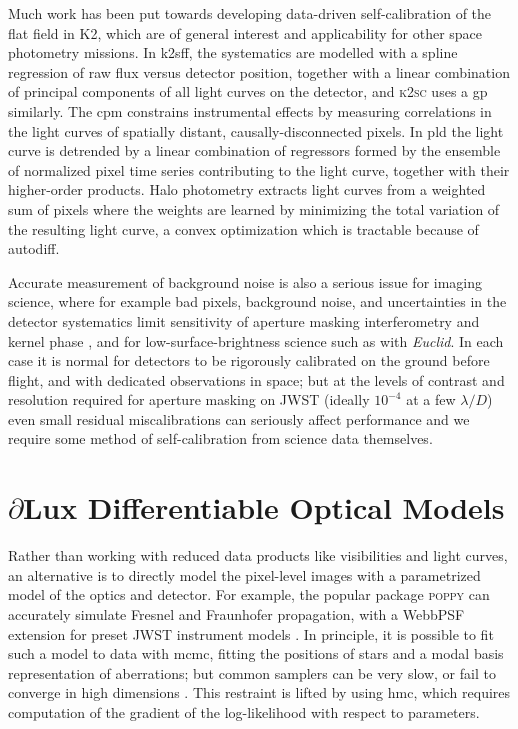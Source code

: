 \documentclass[twocolumn]{spie}
\newcommand\dlux{$\partial$Lux\xspace}
\begin{document}
Much work has been put towards developing data-driven self-calibration of the flat field in K2, which are of general interest and applicability for other space photometry missions. 
In \ac{k2sff}, the systematics are modelled with a spline regression of raw flux versus detector position, together with a linear combination of principal components of all light curves on the detector, and \textsc{k2sc} \cite{Aigrain2016} uses a \ac{gp} similarly. 
The \ac{cpm} constrains instrumental effects by measuring correlations in the light curves of spatially distant, causally-disconnected pixels.
In \ac{pld} the light curve is detrended by a linear combination of regressors formed by the ensemble of normalized pixel time series contributing to the light curve, together with their higher-order products.
Halo photometry \cite{halo, halo2} extracts light curves from a weighted sum of pixels where the weights are learned by minimizing the total variation of the resulting light curve, a convex optimization which is tractable because of autodiff.

Accurate measurement of background noise is also a serious issue for imaging science, where for example bad pixels, background noise, and uncertainties in the detector systematics limit sensitivity of aperture masking interferometry and kernel phase \cite{Kammerer2019}, and for low-surface-brightness science such as with \textit{Euclid}\cite{EuclidCollaboration2022}. In each case it is normal for detectors to be rigorously calibrated on the ground before flight, and with dedicated observations in space; but at the levels of contrast and resolution required for aperture masking on JWST (ideally $10^{-4}$ at a few $\lambda/D$) even small residual miscalibrations can seriously affect performance \cite{Sivaramakrishnan2022} and we require some method of self-calibration from science data themselves.

\section{\dlux Differentiable Optical Models}
\label{sec:dlux}

Rather than working with reduced data products like visibilities and light curves, an alternative is to directly model the pixel-level images with a parametrized model of the optics and detector. 
For example, the popular package \textsc{poppy} \cite{poppy} can accurately simulate Fresnel and Fraunhofer propagation, with a WebbPSF extension for preset JWST instrument models \cite{Perrin2014}. 
In principle, it is possible to fit such a model to data with \ac{mcmc}, fitting the positions of stars and a modal basis representation of aberrations; but common samplers can be very slow, or fail to converge in high dimensions \cite{Huijser2022}. This restraint is lifted by using \ac{hmc}, which requires computation of the gradient of the log-likelihood with respect to parameters. 
\end{document}
